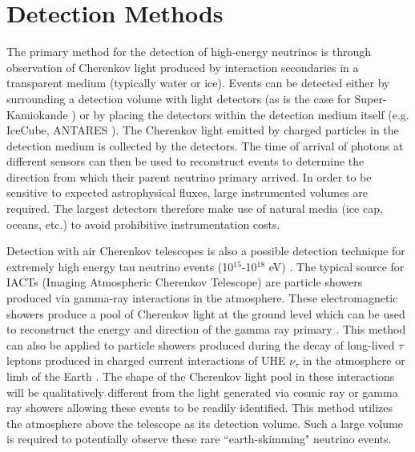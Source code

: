 \documentclass{gatech-thesis}
\begin{document}
\section{Detection Methods}

The primary method for the detection of high-energy neutrinos is through observation of Cherenkov light produced by interaction secondaries in a transparent medium (typically water or ice). Events can be detected either by surrounding a detection volume with light detectors (as is the case for Super-Kamiokande \cite{2003NIMPA.501..418F}) or by placing the detectors within the detection medium itself (e.g. IceCube, ANTARES \cite{2011NIMPA.656...11A}). The Cherenkov light emitted by charged particles in the detection medium is collected by the detectors. The time of arrival of photons at different sensors can then be used to reconstruct events to determine the direction from  which their parent neutrino primary arrived. In order to be sensitive to expected astrophysical fluxes, large instrumented volumes are required. The largest detectors therefore make use of natural media (ice cap, oceans, etc.) to avoid prohibitive instrumentation costs.

Detection with air Cherenkov telescopes is also a possible detection technique for extremely high energy tau neutrino events (10$^{15}$-10$^{18}$ eV) \cite{2013APh....41....7A}. The typical source for IACTs (Imaging Atmospheric Cherenkov Telescope) are particle showers produced via gamma-ray interactions in the atmosphere. These electromagnetic showers produce a pool of Cherenkov light at the ground level which can be used to reconstruct the energy and direction of the gamma ray primary \cite{1993ExA.....2..331A}. This method can also be applied to particle showers produced during the decay of long-lived $\tau$ leptons produced in charged current interactions of UHE $\nu_{\tau}$ in the atmosphere or limb of the Earth \cite{2013APh....41....7A}. The shape of the Cherenkov light pool in these interactions will be qualitatively different from the light generated via cosmic ray or gamma ray showers allowing these events to be readily identified. This method utilizes the atmosphere above the telescope as its detection volume. Such a large volume is required to potentially observe these rare ``earth-skimming" neutrino events.
\end{document}
